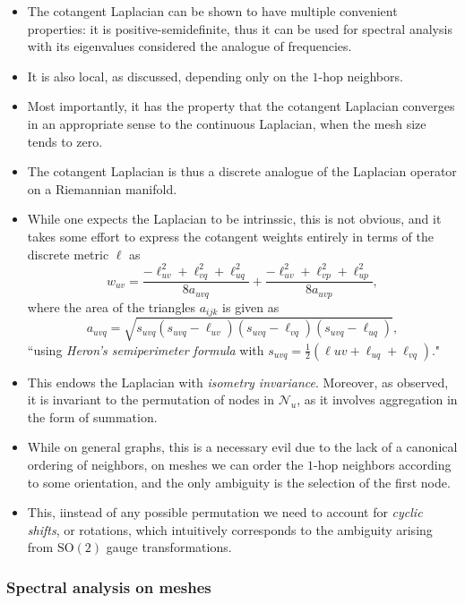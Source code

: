 \documentclass[12pt]{article}
\numberwithin{equation}{section}
\theoremstyle{definition}
\newcommand{		\SO		}	{	\textrm{SO}				}
\newcommand{		\1		}	{	\bm{1}					}%
\begin{document}
\begin{itemize}
\item The cotangent Laplacian can be shown to have multiple convenient properties: it is positive-semidefinite, thus it can be used for spectral analysis with its eigenvalues considered the analogue of frequencies. 
\item It is also local, as discussed, depending only on the $1$-hop neighbors. 
\item Most importantly, it has the property that the cotangent Laplacian converges in an appropriate sense to the continuous Laplacian, when the mesh size tends to zero. 
\item The cotangent Laplacian is thus a discrete analogue of the Laplacian operator on a Riemannian manifold. 
\item While one expects the Laplacian to be intrinssic, this is not obvious, and it takes some effort to express the cotangent weights entirely in terms of the discrete metric $\ell$ as
$$
w_{uv} = \frac{ - \ell_{uv}^2 + \ell_{vq}^2 + \ell_{uq}^2}{ 8 a_{uvq}} + \frac{ - \ell_{uv}^2 + \ell_{vp}^2 + \ell_{up}^2 }{ 8 a_{uvp}} ,
$$
where the area of the triangles $a_{ijk}$ is given as
$$
a_{uvq} = \sqrt{ s_{uvq}(s_{uvq} - \ell_{uv} ) (s_{uvq} - \ell_{vq} ) (s_{uvq} - \ell_{uq} ) },
$$
``using \emph{Heron's semiperimeter formula} with $s_{uvq} = \frac{1}{2} (\ell{uv} + \ell_{uq} + \ell_{vq} ). $"
\item This endows the Laplacian with \emph{isometry invariance}. Moreover, as observed, it is invariant to the permutation of nodes in $\mathcal{N}_u$, as it involves aggregation in the form of summation. 
\item While on general graphs, this is a necessary evil due to the lack of a canonical ordering of neighbors, on meshes we can order the $1$-hop neighbors according to some orientation, and the only ambiguity is the selection of the first node.
\item This, iinstead of any possible permutation we need to account for \emph{cyclic shifts}, or rotations, which intuitively corresponds to the ambiguity arising from $\SO(2)$ gauge transformations. 


\end{itemize}

\subsubsection*{ Spectral analysis on meshes } 
\end{document}
